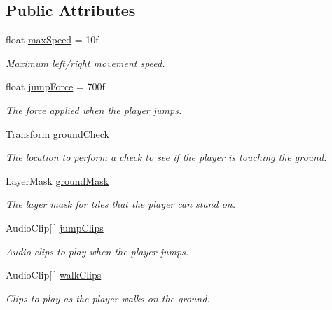 \subsection*{Public Attributes}
\begin{DoxyCompactItemize}
\item 
float \hyperlink{class_infinite_jumper_1_1_player_a77e2cc98878effd33f249f0e58d30d23}{max\+Speed} = 10f
\begin{DoxyCompactList}\small\item\em Maximum left/right movement speed. \end{DoxyCompactList}\item 
float \hyperlink{class_infinite_jumper_1_1_player_a0b83d3c7a02d866e230110ba3c1ac0da}{jump\+Force} = 700f
\begin{DoxyCompactList}\small\item\em The force applied when the player jumps. \end{DoxyCompactList}\item 
Transform \hyperlink{class_infinite_jumper_1_1_player_adaea323de33b7c4094ba8a23fa534f5d}{ground\+Check}
\begin{DoxyCompactList}\small\item\em The location to perform a check to see if the player is touching the ground. \end{DoxyCompactList}\item 
Layer\+Mask \hyperlink{class_infinite_jumper_1_1_player_a914142cd34011ec8ac1a5482d56d2548}{ground\+Mask}
\begin{DoxyCompactList}\small\item\em The layer mask for tiles that the player can stand on. \end{DoxyCompactList}\item 
Audio\+Clip\mbox{[}$\,$\mbox{]} \hyperlink{class_infinite_jumper_1_1_player_a531c3b41299bee812c3c1eb918749d1a}{jump\+Clips}
\begin{DoxyCompactList}\small\item\em Audio clips to play when the player jumps. \end{DoxyCompactList}\item 
Audio\+Clip\mbox{[}$\,$\mbox{]} \hyperlink{class_infinite_jumper_1_1_player_ae09844508009d9007bc7c72572ba99a9}{walk\+Clips}
\begin{DoxyCompactList}\small\item\em Clips to play as the player walks on the ground. \end{DoxyCompactList}\item 

\end{DoxyCompactItemize}
